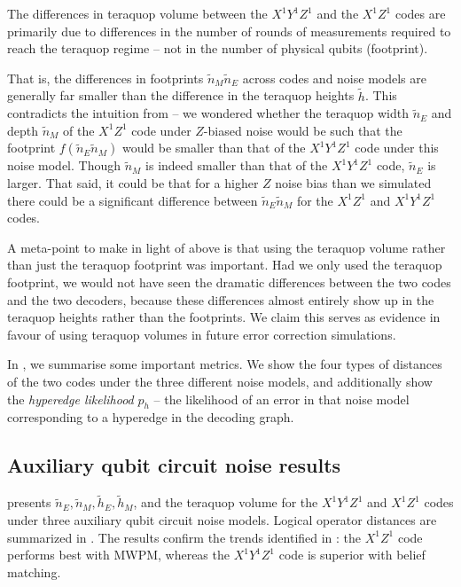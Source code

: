 \begin{keypoint}\label{key:XYZ_XZ_footprints_similar}
    The differences in teraquop volume between the $X^1 Y^1 Z^1$ and the $X^1 Z^1$ codes are primarily due to differences in the number of rounds of measurements required to reach the teraquop regime -- not in the number of physical qubits (footprint).
    
\end{keypoint}

That is, the differences in footprints $\tilde{n}_M \tilde{n}_E$ across codes and noise models are generally far smaller than the difference in the teraquop heights $\tilde{h}$.
This contradicts the intuition from  -- we wondered whether the teraquop width $\tilde{n}_E$ and depth $\tilde{n}_M$ of the $X^1 Z^1$ code under $Z$-biased noise would be such that the footprint $f(\tilde{n}_E \tilde{n}_M)$ would be smaller than that of the $X^1 Y^1 Z^1$ code under this noise model.
Though $\tilde{n}_M$ is indeed smaller than that of the $X^1 Y^1 Z^1$ code, $\tilde{n}_E$ is larger.
That said, it could be that for a higher $Z$ noise bias than we simulated there could be a significant difference between $\tilde{n}_E \tilde{n}_M$ for the $X^1Z^1$ and $X^1Y^1Z^1$ codes.

A meta-point to make in light of  above is that using the teraquop volume rather than just the teraquop footprint was important.
Had we only used the teraquop footprint, we would not have seen the dramatic differences between the two codes and the two decoders, because these differences almost entirely show up in the teraquop heights rather than the footprints.
We claim this serves as evidence in favour of using teraquop volumes in future error correction simulations. 

In , we summarise some important metrics.
We show the four types of distances of the two codes under the three different noise models,
and additionally show the \textit{hyperedge likelihood} $p_h$ -- the likelihood of an error in that noise model corresponding to a hyperedge in the decoding graph.


\subsection{Auxiliary qubit circuit noise results}\label{subsec:unrepeated-auxiliary-qubit-circuit-noise}

 presents $\tilde{n}_E, \tilde{n}_M, \tilde{h}_E, \tilde{h}_M$, and the teraquop volume for the $X^1Y^1Z^1$ and $X^1Z^1$ codes under three auxiliary qubit circuit noise models.
Logical operator distances are summarized in .
The results confirm the trends identified in : the $X^1Z^1$ code performs best with MWPM, whereas the $X^1Y^1Z^1$ code is superior with belief matching.

